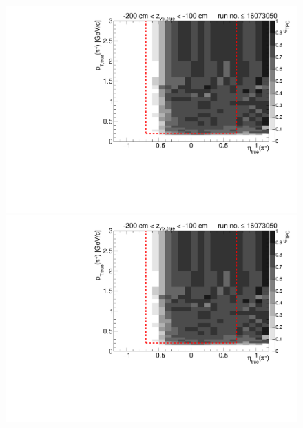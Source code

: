 \begin{figure}[hb]
{  \includegraphics[width=\linewidth,page=16]{graphics/eff/Eff2D_TPC_pion_Plus_RunRange1.pdf}\\
  \includegraphics[width=\linewidth,page=18]{graphics/eff/Eff2D_TPC_pion_Plus_RunRange1.pdf}
}%
\end{figure}


